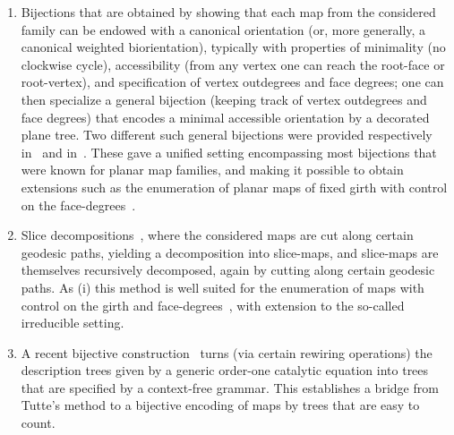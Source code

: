 \documentclass[letter]{amsart}
\numberwithin{theo}{section}
\theoremstyle{remark}
\begin{document}
\begin{enumerate}
\item[(i):] Bijections that are obtained by showing that each map from the considered family can be endowed with a canonical orientation (or, more generally, a canonical weighted biorientation), typically with properties of minimality (no clockwise cycle), accessibility 
(from any vertex one can reach the root-face or root-vertex), and specification of vertex outdegrees and face degrees;  
one can then specialize a general bijection (keeping track of vertex outdegrees and face degrees) that encodes a minimal accessible orientation by a decorated plane tree. Two different such general bijections were provided respectively in~\cite{Bernardi-Fusy:dangulations} and in~\cite{albenque2013generic}. These gave a unified setting encompassing most bijections that were known for planar map families,  %
 and making it possible to obtain extensions such as the enumeration of planar maps of fixed girth with control on the face-degrees~\cite{OB-EF:girth}.    
\item[(ii):] Slice decompositions~\cite{bouttier2012planar}, where the considered maps are cut along certain geodesic paths, yielding a decomposition into slice-maps, and  slice-maps are themselves recursively decomposed, again by cutting along certain geodesic paths. As (i) this method is well suited for the enumeration of maps with control on the girth and face-degrees~\cite{BouttierG14,bouttier2024}, with extension to the so-called irreducible setting.      
\item[(iii):] A recent bijective construction~\cite{duchi2025} turns (via certain rewiring operations) the description trees given by a generic  order-one catalytic equation into trees that are specified by a context-free grammar. This establishes a bridge from Tutte's method to a bijective encoding of maps by  trees that are easy to count.   
\end{enumerate}
\end{document}

